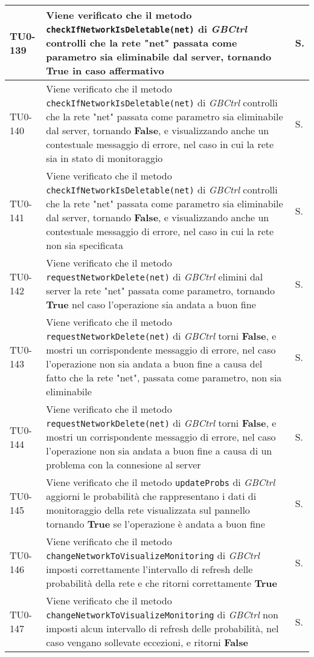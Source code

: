 \begin{longtable}{|C{.15\textwidth}|m{.66\textwidth}|C{.10\textwidth}|}
\hline
{}TU0-139 & Viene verificato che il metodo \texttt{checkIfNetworkIsDeletable(net)} di \textit{GBCtrl} controlli che la rete "net" passata come parametro sia eliminabile dal server, tornando \textbf{True} in caso affermativo & S.\\
\hline
TU0-140 & Viene verificato che il metodo \texttt{checkIfNetworkIsDeletable(net)} di \textit{GBCtrl} controlli che la rete "net" passata come parametro sia eliminabile dal server, tornando \textbf{False}, e visualizzando anche un contestuale messaggio di errore, nel caso in cui la rete sia in stato di monitoraggio & S.\\
\hline
{}TU0-141 & Viene verificato che il metodo \texttt{checkIfNetworkIsDeletable(net)} di \textit{GBCtrl} controlli che la rete "net" passata come parametro sia eliminabile dal server, tornando \textbf{False}, e visualizzando anche un contestuale messaggio di errore, nel caso in cui la rete non sia specificata & S.\\
\hline
TU0-142 & Viene verificato che il metodo \texttt{requestNetworkDelete(net)} di \textit{GBCtrl} elimini dal server la rete "net" passata come parametro, tornando \textbf{True} nel caso l'operazione sia andata a buon fine & S.\\
\hline
{}TU0-143 & Viene verificato che il metodo \texttt{requestNetworkDelete(net)} di \textit{GBCtrl} torni \textbf{False}, e mostri un corrispondente messaggio di errore, nel caso l'operazione non sia andata a buon fine a causa del fatto che la rete "net", passata come parametro, non sia eliminabile & S.\\
\hline
TU0-144 & Viene verificato che il metodo \texttt{requestNetworkDelete(net)} di \textit{GBCtrl} torni \textbf{False}, e mostri un corrispondente messaggio di errore, nel caso l'operazione non sia andata a buon fine a causa di un problema con la connesione al server & S.\\
\hline
{}TU0-145 & Viene verificato che il metodo \texttt{updateProbs} di \textit{GBCtrl} aggiorni le probabilità che rappresentano i dati di monitoraggio della rete visualizzata sul pannello tornando \textbf{True} se l'operazione è andata a buon fine & S.\\
\hline
TU0-146 & Viene verificato che il metodo \texttt{changeNetworkToVisualizeMonitoring} di \textit{GBCtrl} imposti correttamente l'intervallo di refresh delle probabilità della rete e che ritorni correttamente \textbf{True} & S.\\
\hline
{}TU0-147 & Viene verificato che il metodo \texttt{changeNetworkToVisualizeMonitoring} di \textit{GBCtrl} non imposti alcun intervallo di refresh delle probabilità, nel caso vengano sollevate eccezioni, e ritorni \textbf{False} & S.\\

\end{longtable}
